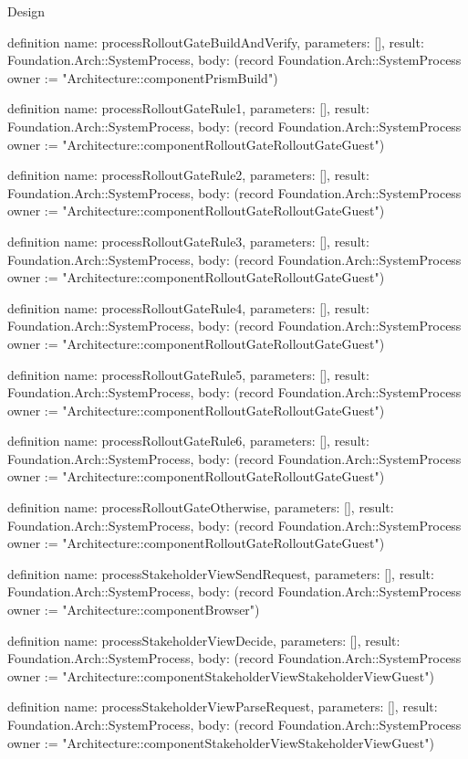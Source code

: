 \begin{lexlean}{Design}
\begin{semanticmodule}
definition{
  name: processRolloutGateBuildAndVerify,
  parameters: [],
  result: Foundation.Arch::SystemProcess,
  body: (record Foundation.Arch::SystemProcess {owner := "Architecture::componentPrismBuild"})
}

definition{
  name: processRolloutGateRule1,
  parameters: [],
  result: Foundation.Arch::SystemProcess,
  body: (record Foundation.Arch::SystemProcess {owner := "Architecture::componentRolloutGateRolloutGateGuest"})
}

definition{
  name: processRolloutGateRule2,
  parameters: [],
  result: Foundation.Arch::SystemProcess,
  body: (record Foundation.Arch::SystemProcess {owner := "Architecture::componentRolloutGateRolloutGateGuest"})
}

definition{
  name: processRolloutGateRule3,
  parameters: [],
  result: Foundation.Arch::SystemProcess,
  body: (record Foundation.Arch::SystemProcess {owner := "Architecture::componentRolloutGateRolloutGateGuest"})
}

definition{
  name: processRolloutGateRule4,
  parameters: [],
  result: Foundation.Arch::SystemProcess,
  body: (record Foundation.Arch::SystemProcess {owner := "Architecture::componentRolloutGateRolloutGateGuest"})
}

definition{
  name: processRolloutGateRule5,
  parameters: [],
  result: Foundation.Arch::SystemProcess,
  body: (record Foundation.Arch::SystemProcess {owner := "Architecture::componentRolloutGateRolloutGateGuest"})
}

definition{
  name: processRolloutGateRule6,
  parameters: [],
  result: Foundation.Arch::SystemProcess,
  body: (record Foundation.Arch::SystemProcess {owner := "Architecture::componentRolloutGateRolloutGateGuest"})
}

definition{
  name: processRolloutGateOtherwise,
  parameters: [],
  result: Foundation.Arch::SystemProcess,
  body: (record Foundation.Arch::SystemProcess {owner := "Architecture::componentRolloutGateRolloutGateGuest"})
}

definition{
  name: processStakeholderViewSendRequest,
  parameters: [],
  result: Foundation.Arch::SystemProcess,
  body: (record Foundation.Arch::SystemProcess {owner := "Architecture::componentBrowser"})
}

definition{
  name: processStakeholderViewDecide,
  parameters: [],
  result: Foundation.Arch::SystemProcess,
  body: (record Foundation.Arch::SystemProcess {owner := "Architecture::componentStakeholderViewStakeholderViewGuest"})
}

definition{
  name: processStakeholderViewParseRequest,
  parameters: [],
  result: Foundation.Arch::SystemProcess,
  body: (record Foundation.Arch::SystemProcess {owner := "Architecture::componentStakeholderViewStakeholderViewGuest"})
}


\end{semanticmodule}
\end{lexlean}
